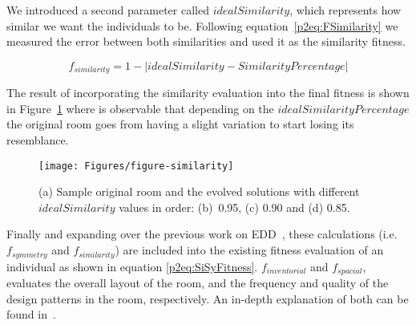 


We introduced a second parameter called \(idealSimilarity\), which represents how similar we want the individuals to be. Following equation~\ref{p2eq:FSimilarity} we measured the error between both similarities and used it as the similarity fitness. 

\begin{equation} \label{p2eq:FSimilarity}
f_{similarity} = 1 - \left |idealSimilarity - SimilarityPercentage \right |
\end{equation}

The result of incorporating the similarity evaluation into the final fitness is shown in Figure~\ref{p2fig:similarity-result} where is observable that depending on the \(idealSimilarityPercentage\) the original room goes from having a slight variation to start losing its resemblance.

\begin{figure}
\texttt{[image: Figures/figure-similarity]}
\caption{(a) Sample original room and the evolved solutions with different \(idealSimilarity\) values in order: (b)~0.95, (c) 0.90 and (d) 0.85.}
\label{p2fig:similarity-result}
\end{figure}

Finally and expanding over the previous work on EDD~\cite{p2Baldwin2017TowardsGeneration}, these calculations (i.e. \(f_{symmetry}\) and \(f_{similarity}\)) are included into the existing fitness evaluation of an individual as shown in equation \ref{p2eq:SiSyFitness}. \(f_{inventorial}\) and \(f_{spacial}\), evaluates the overall layout of the room, and the frequency and quality of the design patterns in the room, respectively. An in-depth explanation of both can be found in~\cite{p2Baldwin2017TowardsGeneration}.

